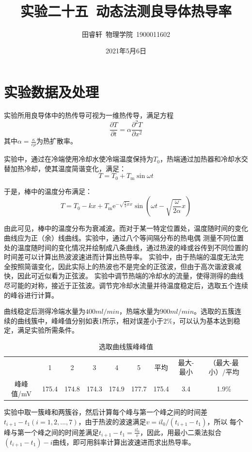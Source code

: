 \documentclass{article}
\title{\heiti 实验二十五\ 动态法测良导体热导率}
\author{\kaishu 田睿轩\ 物理学院\ 1900011602}
\date{2021年5月6日}
\begin{document}
    \maketitle
    \section{实验数据及处理}
    实验所用良导体中的热传导可视为一维热传导，满足方程
    $$\frac{\partial T}{\partial t}=\alpha \frac{\partial^{2} T}{\partial x^{2}}$$
    其中$\alpha=\frac{\kappa}{c\rho}$为热扩散率。

    实验中，通过在冷端使用冷却水使冷端温度保持为$T_0$，热端通过加热器和冷却水交替加热冷却，使其温度简谐变化，满足：
    $$T=T_{0}+T_{\mathrm{m}} \sin \omega t$$

    于是，棒中的温度分布满足：
    $$T=T_{0}-k x+T_{\mathrm{m}} \mathrm{e}^{-\sqrt{\frac{s}{2} x} x} \sin \left(\omega t-\sqrt{\frac{\omega}{2 \alpha}} x\right)$$

    由此可见，棒中的温度分布为衰减波。而对于某一特定位置处，温度随时间的变化曲线应为正（余）线曲线。实验中，通过八个等间隔分布的热电偶
    测量不同位置处的温度随时间的变化情况并绘制成八条曲线，通过热波的峰或谷传到不同位置的时间差可以计算出热波波速进而计算出热导率。
    实验中，由于热端的温度无法完全按照简谐变化，因此实际上的热波也不是完全的正弦波，但由于高次谐波衰减快，因此可近似看为正弦波。
    实验中调节热端的冷却水的流量，使得测得的曲线尽可能的对称，接近于正弦波。调节完冷却水流量并待温度稳定后，选取五个连续的峰谷进行计算。

    曲线稳定后测得冷端水量为$400ml/min$，热端水量为$900ml/min$。选取的五簇连续的曲线簇中，峰峰值分别如表1所示，相对误差小于$2\%$，可以认为基本达到稳定，满足实验所需条件。
    \begin{table}[h]
        \centering
        \caption{选取曲线簇峰峰值}
        \vspace{1ex}
        \begin{tabular}{ccccccccc}
            \hline
                  & 1     & 2     & 3     & 4     & 5     & 平均    & 最大-最小 & （最大-最小）/平均 \bigstrut[t]\\
            峰峰值/mV & 175.4 & 174.8 & 174.3 & 174.9 & 177.7 & 175.4  & 3.4   & 1.9\% \bigstrut[b]\\
            \hline
        \end{tabular}%
    \end{table}

    实验中取一簇峰和两簇谷，然后计算每个峰与第一个峰之间的时间差$t_{i+1}-t_{1}(i=1,2,...,7)$，由于热波的波速满足$v=i l_{0} /\left(t_{i+1}-t_{1}\right)$，所以
    每个峰与第一个峰之间的时间差满足$t_{i+1}-t_{1}=\frac{i l_{0}}{v}$，因此，用最小二乘法拟合$\left(t_{i+1}-t_{1}\right)-i$曲线，即可用斜率计算出波速进而求出热导率。
\end{document}

